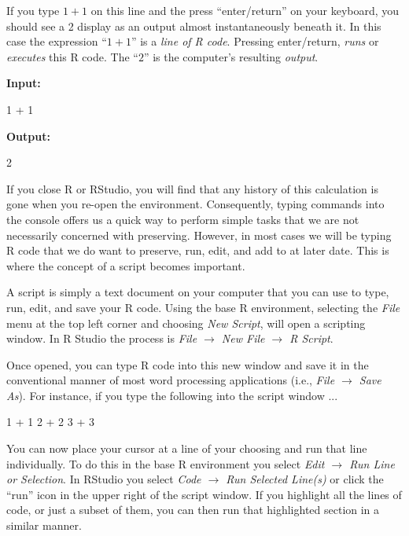 If you type $1 + 1$ on this line and the press ``enter/return'' on your keyboard, you should see a 2 display as an output almost instantaneously beneath it.  In this case the expression ``$1 + 1$'' is a \textit{line of R code}.  Pressing enter/return, \textit{runs} or \textit{executes} this R code. The ``$2$'' is the computer's resulting \textit{output}.

\textbf{Input:}
\begin{inR}
1 + 1
\end{inR}

\vspace{1em}

\textbf{Output:}
\begin{outR}
[1] 2
\end{outR}


If you close R or RStudio, you will find that any history of this calculation is gone when you re-open the environment.  Consequently, typing commands into the console offers us a quick way to perform simple tasks that we are not necessarily concerned with preserving.  However, in most cases we will be typing R code that we do want to preserve, run, edit, and add to at later date.  This is where the concept of a \gls{script} becomes important.

A script is simply a text document on your computer that you can use to type, run, edit, and save your R code. Using the base R environment, selecting the \textit{File} menu at the top left corner and choosing \textit{New Script}, will open a scripting window.  In R Studio the process is \textit{File $\rightarrow$ New File $\rightarrow$ R Script}.  

Once opened, you can type R code into this new window and save it in the conventional manner of most word processing applications (i.e., \textit{File $\rightarrow$ Save As}). For instance, if you type the following into the script window ...

\begin{inR}
1 + 1
2 + 2
3 + 3
\end{inR}

\medskip

You can now place your cursor at a line of your choosing and run that line individually.  To do this in the base R environment you select \textit{Edit $\rightarrow$ Run Line or Selection}.  In RStudio you select \textit{Code $\rightarrow$ Run Selected Line(s)} or click the ``run'' icon in the upper right of the script window. If you highlight all the lines of code, or just a subset of them, you can then run that highlighted section in a similar manner.

